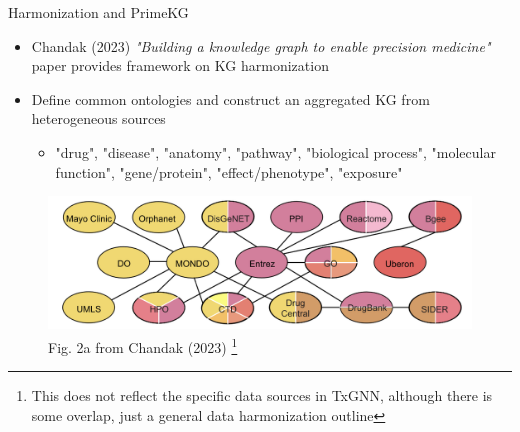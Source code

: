 \documentclass{beamer}
\begin{document}
\begin{frame}{Harmonization and PrimeKG}
    \begin{itemize}
        \item Chandak (2023) \textit{"Building a knowledge graph to enable precision medicine"} paper provides framework on KG harmonization \cite{chandak_building_2023}
        \item Define common ontologies and construct an aggregated KG from heterogeneous sources 
        \begin{itemize}
            \item "drug", "disease", "anatomy", "pathway", "biological process", "molecular function", "gene/protein", "effect/phenotype", "exposure"
        \end{itemize}
    \end{itemize}

    \begin{figure}
        \centering 
        \includegraphics[scale=0.4]{Chandak_KG_Arch.png}
        \caption{Fig. 2a from Chandak (2023) \cite{chandak_building_2023}\footnote{This does not reflect the specific data sources in TxGNN, although there is some overlap, just a general data harmonization outline}}
    \end{figure}
\end{frame}
\end{document}
